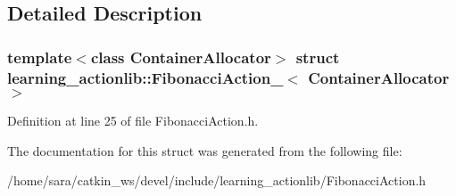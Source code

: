\subsection{Detailed Description}
\subsubsection*{template$<$class Container\+Allocator$>$\newline
struct learning\+\_\+actionlib\+::\+Fibonacci\+Action\+\_\+$<$ Container\+Allocator $>$}



Definition at line 25 of file Fibonacci\+Action.\+h.



The documentation for this struct was generated from the following file\+:\begin{DoxyCompactItemize}
\item 
/home/sara/catkin\+\_\+ws/devel/include/learning\+\_\+actionlib/Fibonacci\+Action.\+h\end{DoxyCompactItemize}
